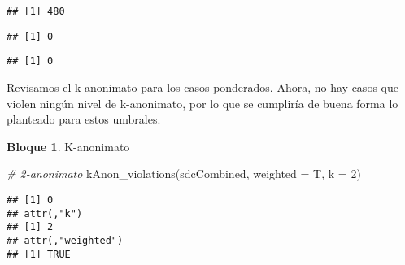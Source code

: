 \documentclass[
]{book}
\newenvironment{Shaded}{\begin{snugshade}}{\end{snugshade}}
\newcommand{\AttributeTok}[1]{\textcolor[rgb]{0.77,0.63,0.00}{#1}}
\newcommand{\CommentTok}[1]{\textcolor[rgb]{0.56,0.35,0.01}{\textit{#1}}}
\newcommand{\DecValTok}[1]{\textcolor[rgb]{0.00,0.00,0.81}{#1}}
\newcommand{\FloatTok}[1]{\textcolor[rgb]{0.00,0.00,0.81}{#1}}
\newcommand{\FunctionTok}[1]{\textcolor[rgb]{0.00,0.00,0.00}{#1}}
\newcommand{\NormalTok}[1]{#1}
\newcommand{\SpecialCharTok}[1]{\textcolor[rgb]{0.00,0.00,0.00}{#1}}
\newcommand{\StringTok}[1]{\textcolor[rgb]{0.31,0.60,0.02}{#1}}
\theoremstyle{definition}
\theoremstyle{definition}
\newtheorem{example}{Bloque}[chapter]
\theoremstyle{definition}
\theoremstyle{definition}
\theoremstyle{remark}
\begin{document}
\begin{verbatim}
## [1] 480
\end{verbatim}

\begin{Shaded}
\end{Shaded}

\begin{verbatim}
## [1] 0
\end{verbatim}

\begin{Shaded}
\end{Shaded}

\begin{verbatim}
## [1] 0
\end{verbatim}

Revisamos el k-anonimato para los casos ponderados. Ahora, no hay casos que violen ningún nivel de k-anonimato, por lo que se cumpliría de buena forma lo planteado para estos umbrales.

\begin{example}
\protect\hypertarget{exm:bloque68nbm}{}\label{exm:bloque68nbm}K-anonimato
\end{example}

\begin{Shaded}
\begin{Highlighting}[]
\CommentTok{\# 2{-}anonimato}
\FunctionTok{kAnon\_violations}\NormalTok{(sdcCombined, }\AttributeTok{weighted =}\NormalTok{ T, }\AttributeTok{k =} \DecValTok{2}\NormalTok{) }
\end{Highlighting}
\end{Shaded}

\begin{verbatim}
## [1] 0
## attr(,"k")
## [1] 2
## attr(,"weighted")
## [1] TRUE
\end{verbatim}
\end{document}
